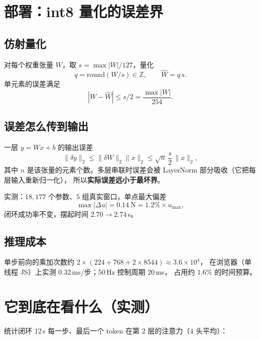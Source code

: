 \section{部署：int8 量化的误差界}

\subsection{仿射量化}

对每个权重张量 $W$，取 $s=\max|W|/127$，量化
\begin{equation}
  q=\mathrm{round}(W/s)\in\mathbb{Z},\qquad \hat W=q\,s .
\end{equation}
单元素的误差满足
\begin{equation}
  |W-\hat W|\le s/2=\frac{\max|W|}{254}.
\end{equation}

\subsection{误差怎么传到输出}

一层 $y=Wx+b$ 的输出误差
\begin{equation}
  \|\delta y\|_2\le\|\delta W\|_2\|x\|_2
  \le \sqrt{n}\,\frac{s}{2}\,\|x\|_2 ,
\end{equation}
其中 $n$ 是该张量的元素个数。多层串联时误差会被 LayerNorm 部分吸收（它把每层输入重新归一化），
所以\textbf{实际误差远小于最坏界}。

实测：$18{,}177$ 个参数、$5$ 组真实窗口，单点最大偏差
\begin{equation}
  \max|\Delta u|=0.14\ \mathrm{N}=1.2\%\times u_{\max},
\end{equation}
闭环成功率不变，摆起时间 $2.70\to2.74$\,s。

\subsection{推理成本}

单步前向的乘加次数约 $2\times(224+768+2\times8544)\approx3.6\times10^{4}$，
在浏览器（单线程 JS）上实测 $0.32$\,ms/步；$50$\,Hz 控制周期 $20$\,ms，
占用约 $1.6\%$ 的时间预算。

\section{它到底在看什么（实测）}

统计闭环 $12$\,s 每一步、最后一个 token 在第 2 层的注意力（$4$ 头平均）：

